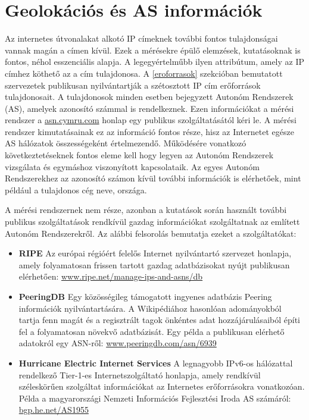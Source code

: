 \section{Geolokációs és AS információk}
Az internetes útvonalakat alkotó IP címeknek további fontos tulajdonságai vannak magán a címen kívül. Ezek a mérésekre épülő elemzések, kutatásoknak is fontos, néhol esszenciális alapja. A legegyértelműbb ilyen attribútum, amely az IP címhez köthető az a cím tulajdonosa. A \ref{eroforrasok} szekcióban bemutatott szervezetek publikusan nyilvántartják a szétosztott IP cím erőforrások tulajdonosait. A tulajdonosok minden esetben bejegyzett Autonóm Rendszerek (AS), amelyek azonosító számmal is rendelkeznek. Ezen információkat a mérési rendszer a \href{http://asn.cymru.com/cgi-bin/whois.cgi}{asn.cymru.com} honlap egy publikus szolgáltatásától kéri le. A mérési rendszer kimutatásainak ez az információ fontos része, hisz az Internetet egésze AS hálózatok összességeként értelmezendő. Működésére vonatkozó következtetéseknek fontos eleme kell hogy legyen az Autonóm Rendszerek vizsgálata és egymáshoz viszonyított kapcsolataik. Az egyes Autonóm Rendszerekhez az azonosító számon kívül további információk is elérhetőek, mint például a tulajdonos cég neve, országa.

A mérési rendszernek nem része, azonban a kutatások során használt további publikus szolgáltatások  rendkívül gazdag információkat szolgáltatnak az említett Autonóm Rendszerekről. Az alábbi felsorolás bemutatja ezeket a szolgáltatókat:

\begin{itemize}
\item \textbf{RIPE} Az európai régióért felelős Internet nyilvántartó szervezet honlapja, amely folyamatosan frissen tartott gazdag adatbázisokat nyújt publikusan elérhetően: \linebreak  \href{https://www.ripe.net/manage-ips-and-asns/db}{www.ripe.net/manage-ips-and-asns/db}

\item \textbf{PeeringDB} Egy közösségileg támogatott ingyenes adatbázis Peering információk nyil\-ván\-tar\-tá\-sá\-ra. A Wikipédiához hasonlóan adományokból tartja fenn magát és a regisztrált tagok önkéntes adat hozzájárulásaiból építi fel a folyamatosan növekvő a\-dat\-bá\-zi\-sát. Egy példa a publikusan elérhető adatokról egy ASN-ről:  \linebreak  \href{https://www.peeringdb.com/asn/6939}{www.peeringdb.com/asn/6939}

\item \textbf{Hurricane Electric Internet Services} A legnagyobb IPv6-os hálózattal rendelkező Tier-1-es Internetszolgáltató honlapja, amely rendkívül széleskörűen szolgáltat információkat az Internetes erőforrásokra vonatkozóan. Példa a magyarországi Nemzeti Információs Fejlesztési Iroda AS számáról: \pagebreak
\href{http://bgp.he.net/AS1955}{bgp.he.net/AS1955}
\end{itemize}


